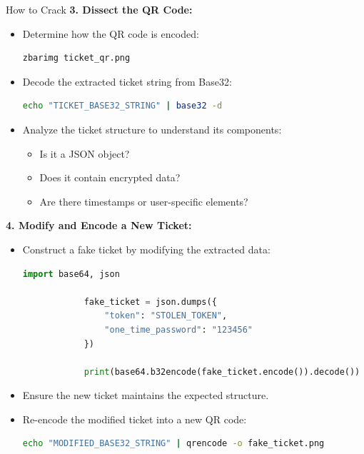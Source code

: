 \documentclass[final,dvipsnames]{beamer}
\newlength{\colwidth}
\begin{document}
\begin{frame}[t, fragile]
\begin{columns}[t]
\begin{column}{\colwidth}
\begin{block}{How to Crack}
        \textbf{3. Dissect the QR Code:}
        \begin{itemize}
            \item Determine how the QR code is encoded:
            \begin{lstlisting}[language=bash]
            zbarimg ticket_qr.png
            \end{lstlisting}
            \item Decode the extracted ticket string from Base32:
            \begin{lstlisting}[language=bash]
            echo "TICKET_BASE32_STRING" | base32 -d
            \end{lstlisting}
            \item Analyze the ticket structure to understand its components:
            \begin{itemize}
                \item Is it a JSON object?
                \item Does it contain encrypted data?
                \item Are there timestamps or user-specific elements?
            \end{itemize}
        \end{itemize}

        \textbf{4. Modify and Encode a New Ticket:}
        \begin{itemize}
            \item Construct a fake ticket by modifying the extracted data:
            \begin{lstlisting}[language=Python]
            import base64, json

            fake_ticket = json.dumps({
                "token": "STOLEN_TOKEN", 
                "one_time_password": "123456"
            })

            print(base64.b32encode(fake_ticket.encode()).decode())
            \end{lstlisting}
            \item Ensure the new ticket maintains the expected structure.
            \item Re-encode the modified ticket into a new QR code:
            \begin{lstlisting}[language=bash]
            echo "MODIFIED_BASE32_STRING" | qrencode -o fake_ticket.png
            \end{lstlisting}
        \end{itemize}


\end{block}
\end{column}
\end{columns}
\end{frame}
\end{document}
